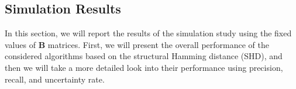 \documentclass[twoside, 11pt]{article}
\begin{document}




\subsection{Simulation Results} \label{simresults}
In this section, we will report the results of the simulation study using the fixed values of $\mathbf{B}$ matrices. First, we will present the overall performance of the considered algorithms based on the structural Hamming distance (SHD), and then we will take a more detailed look into their performance using precision, recall, and uncertainty rate. 
\end{document}
